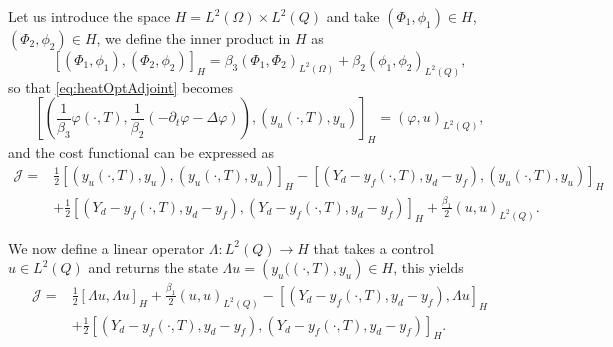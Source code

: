 \documentclass[12pt,a4paper]{article}
\theoremstyle{plain}
\theoremstyle{definition}
\begin{document}
Let us introduce the space $H=L^2 \left( \Omega \right) \times L^2 \left( Q \right)$ and take $\left( \Phi_1, \phi_1 \right) \in H$, $\left( \Phi_2, \phi_2 \right) \in H$, we define the inner product in $H$ as
%
\begin{equation} \label{eq:heatOptInternalProductH}
\left[ \left( \Phi_1, \phi_1 \right), \left( \Phi_2, \phi_2 \right) \right]_H = \beta_3 \left( \Phi_1, \Phi_2 \right)_{L^2 \left( \Omega \right)} + \beta_2 \left( \phi_1, \phi_2 \right)_{L^2\left( Q \right)},
\end{equation}
%
so that \eqref{eq:heatOptAdjoint} becomes
%
\begin{equation} \label{eq:heatOptAdjoint2}
\left[ \left( \frac{1}{\beta_3} \varphi \left( \cdot, T \right), \frac{1}{\beta_2} \left(-\partial_t \varphi - \Delta \varphi \right) \right), \left( y_u \left( \cdot, T \right), y_u \right) \right]_H = \left( \varphi, u \right)_{L^2\left( Q \right)},
\end{equation}
%
and the cost functional can be expressed as
%
\begin{equation*}
\begin{split}
\mathcal{J} = & \frac{1}{2} \left[ \left( y_u \left( \cdot, T \right), y_u \right), \left( y_u \left( \cdot, T \right), y_u \right) \right]_H - \left[ \left( Y_d - y_f \left( \cdot, T \right), y_d - y_f \right), \left( y_u \left( \cdot, T \right), y_u \right) \right]_H \\ & + \frac{1}{2} \left[ \left( Y_d - y_f \left( \cdot, T \right), y_d - y_f \right), \left( Y_d - y_f \left( \cdot, T \right), y_d - y_f \right) \right]_H + \frac{\beta_1}{2} \left( u, u \right)_{L^2\left( Q \right)}.
\end{split}
\end{equation*}

We now define a linear operator $\Lambda: L^2\left( Q \right) \rightarrow H$ that takes a control $u \in L^2\left( Q \right)$ and returns the state $\Lambda u = \left( y_u (\left( \cdot, T \right), y_u \right) \in H$, this yields
%
\begin{equation} \label{eq:costFunctionOperator}
\begin{split}
\mathcal{J} = & \frac{1}{2} \left[ \Lambda u, \Lambda u \right]_H + \frac{\beta_1}{2} \left( u, u \right)_{L^2\left(Q \right)} - \left[ \left( Y_d - y_f \left( \cdot, T \right), y_d - y_f \right), \Lambda u \right]_H \\ & + \frac{1}{2} \left[ \left( Y_d - y_f \left( \cdot, T \right), y_d - y_f \right), \left( Y_d - y_f \left( \cdot, T \right), y_d - y_f \right) \right]_H.
\end{split}
\end{equation}
\end{document}
